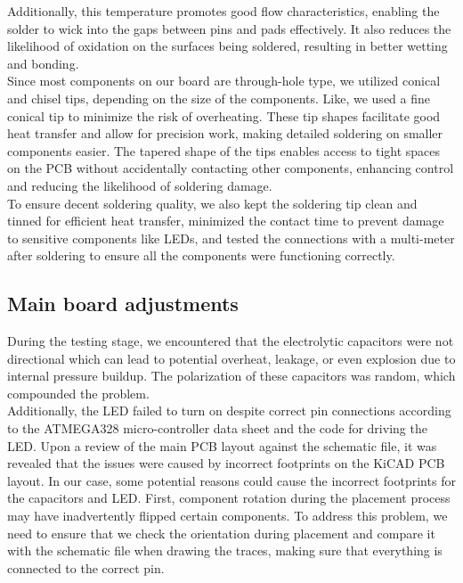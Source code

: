 \documentclass{article}
\begin{document}
Additionally, this temperature promotes good flow characteristics, enabling the solder to wick into the gaps between pins and pads effectively. It also reduces the likelihood of oxidation on the surfaces being soldered, resulting in better wetting and bonding.  
\\

Since most components on our board are through-hole type, we utilized conical and chisel tips, depending on the size of the components. Like, we used a fine conical tip to minimize the risk of overheating. These tip shapes facilitate good heat transfer and allow for precision work, making detailed soldering on smaller components easier. The tapered shape of the tips enables access to tight spaces on the PCB without accidentally contacting other components, enhancing control and reducing the likelihood of soldering damage. 
\\

To ensure decent soldering quality, we also kept the soldering tip clean and tinned for efficient heat transfer, minimized the contact time to prevent damage to sensitive components like LEDs, and tested the connections with a multi-meter after soldering to ensure all the components were functioning correctly. 

\subsection{Main board adjustments}

During the testing stage, we encountered that the electrolytic capacitors were not directional which can lead to potential overheat, leakage, or even explosion due to internal pressure buildup. The polarization of these capacitors was random, which compounded the problem.  
\\

Additionally, the LED failed to turn on despite correct pin connections according to the ATMEGA328 micro-controller data sheet and the code for driving the LED. Upon a review of the main PCB layout against the schematic file, it was revealed that the issues were caused by incorrect footprints on the KiCAD PCB layout. In our case, some potential reasons could cause the incorrect footprints for the capacitors and LED. First, component rotation during the placement process may have inadvertently flipped certain components. To address this problem, we need to ensure that we check the orientation during placement and compare it with the schematic file when drawing the traces, making sure that everything is connected to the correct pin.  
\\
\end{document}

